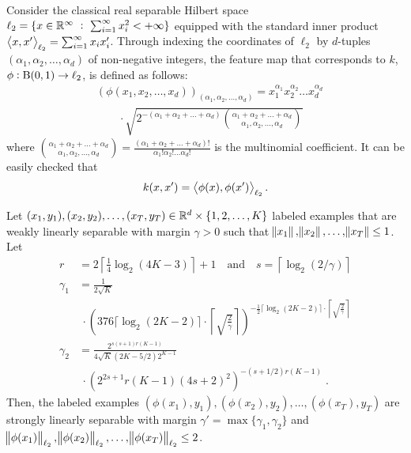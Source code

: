 Consider the
classical real separable Hilbert space $\ell_2 = \{ x \in \mathbb{R}^\infty ~:~
\sum_{i=1}^\infty x_i^2 < + \infty \}$ equipped with the standard inner product
$\left\langle x, x' \right\rangle_{\ell_2} = \sum_{i=1}^\infty x_i x'_i$.
Through indexing the coordinates of
$\ell_2$ by $d$-tuples $(\alpha_1, \alpha_2, \dots, \alpha_d)$ of non-negative
integers, the feature map that corresponds to $k$, $\phi: \operatorname{B}(0,1) \to \ell_2$, is defined as follows:
\begin{align*}
& \left(\phi(x_1, x_2, \dots, x_d)\right)_{(\alpha_1, \alpha_2, \dots, \alpha_d)} = x_1^{\alpha_1} x_2^{\alpha_2} \dots x_d^{\alpha_d} \\
& \qquad \cdot \sqrt{2^{-(\alpha_1 + \alpha_2 + \dots + \alpha_d)} \binom{\alpha_1 + \alpha_2 + \dots + \alpha_d}{\alpha_1, \alpha_2, \dots, \alpha_d}}
\end{align*}
where $\binom{\alpha_1 + \alpha_2 + \dots + \alpha_d}{\alpha_1, \alpha_2, \dots, \alpha_d} = \frac{(\alpha_1 + \alpha_2 + \dots + \alpha_d)!}{\alpha_1! \alpha_2! \dots \alpha_d!}$
is the multinomial coefficient.
It can be easily checked that
\[ k(x,x') = \left\langle \phi(x), \phi(x') \right\rangle_{\ell_2}. \]



\begin{theorem}
\label{theorem:margin-transformation}
Let $(x_1, y_1), (x_2, y_2), \dots, (x_T, y_T) \in \mathbb{R}^d \times \{1,2,\dots,K\}$
labeled examples that are weakly linearly separable with margin $\gamma > 0$
such that $\norm{x_1}, \norm{x_2}, \dots, \norm{x_T} \le 1$.
Let
\begin{align*}
r & = 2 \left\lceil \frac{1}{4} \log_2(4K-3) \right\rceil + 1 \quad \text{and} \quad s = \left \lceil \log_2(2/\gamma) \right \rceil \\
\gamma_1 & = \frac{1}{2\sqrt{K}}  \\
& \ \cdot \left(376 \lceil \log_2(2K-2) \rceil \cdot \left \lceil \sqrt{\frac{2}{\gamma}} \right \rceil \right)^{-\frac{1}{2} \lceil \log_2(2K-2) \rceil \cdot \left \lceil \sqrt{\frac{2}{\gamma}} \right \rceil} \\
\gamma_2 & = \frac{2^{s(s+1)r(K-1)} }{4\sqrt{K}(2K-5/2) 2^{K-1}} \\
& \ \cdot \left(2^{2s+1} r(K-1) (4s+2)^2 \right)^{-(s+1/2)r(K-1)} \; .
\end{align*}
Then, the labeled examples $(\phi(x_1), y_1), (\phi(x_2), y_2), \dots,
(\phi(x_T), y_T)$ are strongly linearly separable with margin $\gamma' =
\max\{\gamma_1, \gamma_2\}$ and $\norm{\phi(x_1)}_{\ell_2},
\norm{\phi(x_2)}_{\ell_2}, \dots, \norm{\phi(x_T)}_{\ell_2} \le 2$.
\end{theorem}

